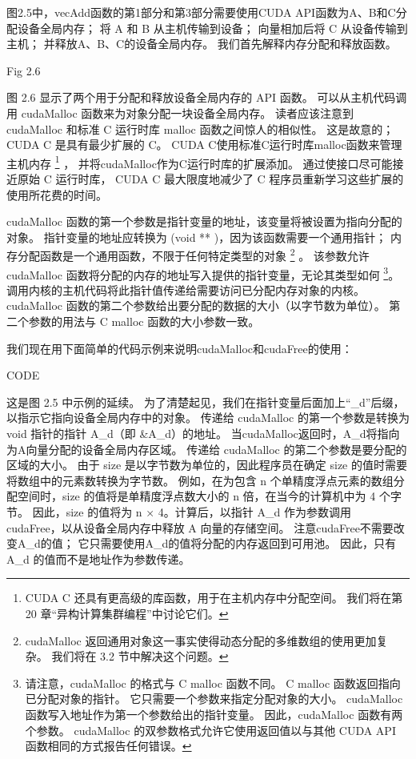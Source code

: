 图2.5中，vecAdd函数的第1部分和第3部分需要使用CUDA API函数为A、B和C分配设备全局内存； 
将 A 和 B 从主机传输到设备； 向量相加后将 C 从设备传输到主机； 并释放A、B、C的设备全局内存。
我们首先解释内存分配和释放函数。

{\color{red} Fig 2.6}

图 2.6 显示了两个用于分配和释放设备全局内存的 API 函数。 
可以从主机代码调用 cudaMalloc 函数来为对象分配一块设备全局内存。 
读者应该注意到 cudaMalloc 和标准 C 运行时库 malloc 函数之间惊人的相似性。 
这是故意的； CUDA C 是具有最少扩展的 C。 CUDA C使用标准C运行时库malloc函数来管理主机内存
\footnote{CUDA C 还具有更高级的库函数，用于在主机内存中分配空间。 我们将在第 20 章“异构计算集群编程”中讨论它们。} ，
并将cudaMalloc作为C运行时库的扩展添加。 通过使接口尽可能接近原始 C 运行时库，
CUDA C 最大限度地减少了 C 程序员重新学习这些扩展的使用所花费的时间。

cudaMalloc 函数的第一个参数是指针变量的地址，该变量将被设置为指向分配的对象。
指针变量的地址应转换为 (void ** )，因为该函数需要一个通用指针； 内存分配函数是一个通用函数，不限于任何特定类型的对象
\footnote{cudaMalloc 返回通用对象这一事实使得动态分配的多维数组的使用更加复杂。 我们将在 3.2 节中解决这个问题。} 。
该参数允许 cudaMalloc 函数将分配的内存的地址写入提供的指针变量，无论其类型如何
\footnote{请注意，cudaMalloc 的格式与 C malloc 函数不同。 C malloc 函数返回指向已分配对象的指针。 
它只需要一个参数来指定分配对象的大小。 cudaMalloc 函数写入地址作为第一个参数给出的指针变量。 
因此，cudaMalloc 函数有两个参数。 
cudaMalloc 的双参数格式允许它使用返回值以与其他 CUDA API 函数相同的方式报告任何错误。}。
调用内核的主机代码将此指针值传递给需要访问已分配内存对象的内核。 
cudaMalloc 函数的第二个参数给出要分配的数据的大小（以字节数为单位）。 
第二个参数的用法与 C malloc 函数的大小参数一致。

我们现在用下面简单的代码示例来说明cudaMalloc和cudaFree的使用：

{\color{red} CODE}

这是图 2.5 中示例的延续。 为了清楚起见，我们在指针变量后面加上“\_d”后缀，以指示它指向设备全局内存中的对象。 
传递给 cudaMalloc 的第一个参数是转换为 void 指针的指针 A\_d（即 \&A\_d）的地址。 
当cudaMalloc返回时，A\_d将指向为A向量分配的设备全局内存区域。 传递给 cudaMalloc 的第二个参数是要分配的区域的大小。 
由于 size 是以字节数为单位的，因此程序员在确定 size 的值时需要将数组中的元素数转换为字节数。 
例如，在为包含 n 个单精度浮点元素的数组分配空间时，size 的值将是单精度浮点数大小的 n 倍，在当今的计算机中为 4 个字节。 
因此，size 的值将为 n × 4。计算后，以指针 A\_d 作为参数调用 cudaFree，以从设备全局内存中释放 A 向量的存储空间。 
注意cudaFree不需要改变A\_d的值； 它只需要使用A\_d的值将分配的内存返回到可用池。 
因此，只有 A\_d 的值而不是地址作为参数传递。

